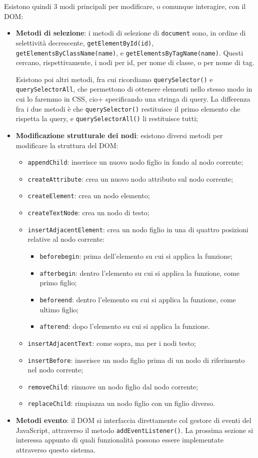 \documentclass[a4paper,11pt]{article}
\begin{document}
Esistono quindi 3 modi principali per modificare, o comunque interagire, con il DOM:
\begin{itemize}
	\item \textbf{Metodi di selezione}: i metodi di selezione di \lstinline|document| sono, in ordine di selettività decrescente, \lstinline|getElementById(id)|, \lstinline|getElementsByClassName(name)|, e \lstinline|getElementsByTagName(name)|.
	Questi cercano, rispettivamente, i nodi per id, per nome di classe, o per nome di tag.
	
	Esistono poi altri metodi, fra cui ricordiamo \lstinline|querySelector()| e \lstinline|querySelectorAll|, che permettono di ottenere elementi nello stesso modo in cui lo faremmo in CSS, cio+ specificando una stringa di query.
	La differenza fra i due metodi è che \lstinline|querySelector()| restituisce il primo elemento che rispetta la query, e \lstinline|querySelectorAll()| li restituisce tutti;
	\item \textbf{Modificazione strutturale dei nodi}:
esistono diversi metodi per modificare la struttura del DOM:
\begin{itemize}
	\item \lstinline|appendChild|: inserisce un nuovo nodo figlio in fondo al nodo corrente;
	\item \lstinline|createAttribute|: crea un nuovo nodo attributo sul nodo corrente;
	\item \lstinline|createElement|: crea un nodo elemento;
	\item \lstinline|createTextNode|: crea un nodo di testo;
	\item \lstinline|insertAdjacentElement|: crea un nodo figlio in una di quattro posizioni relative al nodo corrente:
		\begin{itemize}
			\item \lstinline|beforebegin|: prima dell'elemento su cui si applica la funzione;
			\item \lstinline|afterbegin|: dentro l'elemento su cui si applica la funzione, come primo figlio;
			\item \lstinline|beforeend|: dentro l'elemento su cui si applica la funzione, come ultimo figlio;
			\item \lstinline|afterend|: dopo l'elemento su cui si applica la funzione.
		\end{itemize}
	\item \lstinline|insertAdjacentText|: come sopra, ma per i nodi testo;
	\item \lstinline|insertBefore|: inserisce un nodo figlio prima di un nodo di riferimento nel nodo corrente;
	\item \lstinline|removeChild|: rimuove un nodo figlio dal nodo corrente;
	\item \lstinline|replaceChild|: rimpiazza un nodo figlio con un figlio diverso. 
\end{itemize}
	\item \textbf{Metodi evento}: il DOM si interfaccia direttamente col gestore di eventi del JavaScript, attraverso il metodo \lstinline|addEventListener()|. La prossima sezione si interessa appunto di quali funzionalità possono essere implementate attraverso questo sistema.
\end{itemize}
\end{document}
